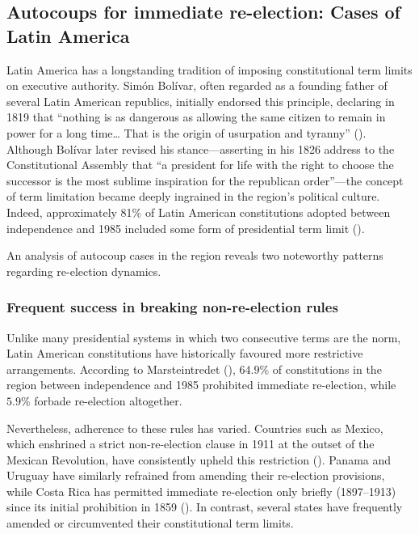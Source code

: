 \documentclass[
  12pt,
]{report}
\begin{document}
\subsection{Autocoups for immediate re-election: Cases of Latin
America}\label{autocoups-for-immediate-re-election-cases-of-latin-america}

Latin America has a longstanding tradition of imposing constitutional
term limits on executive authority. Simón Bolívar, often regarded as a
founding father of several Latin American republics, initially endorsed
this principle, declaring in 1819 that ``nothing is as dangerous as
allowing the same citizen to remain in power for a long time\ldots{}
That is the origin of usurpation and tyranny''
(). Although
Bolívar later revised his stance---asserting in his 1826 address to the
Constitutional Assembly that ``a president for life with the right to
choose the successor is the most sublime inspiration for the republican
order''---the concept of term limitation became deeply ingrained in the
region's political culture. Indeed, approximately 81\% of Latin American
constitutions adopted between independence and 1985 included some form
of presidential term limit
().

An analysis of autocoup cases in the region reveals two noteworthy
patterns regarding re-election dynamics.

\subsubsection*{Frequent success in breaking non-re-election
rules}\label{frequent-success-in-breaking-non-re-election-rules}

Unlike many presidential systems in which two consecutive terms are the
norm, Latin American constitutions have historically favoured more
restrictive arrangements. According to Marsteintredet
(), \(64.9\%\) of constitutions
in the region between independence and 1985 prohibited immediate
re-election, while \(5.9\%\) forbade re-election altogether.

Nevertheless, adherence to these rules has varied. Countries such as
Mexico, which enshrined a strict non-re-election clause in 1911 at the
outset of the Mexican Revolution, have consistently upheld this
restriction (). Panama and
Uruguay have similarly refrained from amending their re-election
provisions, while Costa Rica has permitted immediate re-election only
briefly (1897--1913) since its initial prohibition in 1859
(). In contrast,
several states have frequently amended or circumvented their
constitutional term limits.
\end{document}
